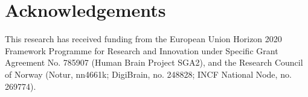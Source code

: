\documentclass[preprint,11pt,authoryear]{elsarticle}
\begin{document}




\section*{Acknowledgements}
\label{sec:acknowledgements}
This research has received funding from the European Union Horizon 2020 Framework Programme for Research
and Innovation under Specific Grant Agreement No. 785907 (Human Brain Project SGA2), and the Research Council of Norway (Notur, nn4661k; DigiBrain, no. 248828; INCF National Node, no. 269774).




\label{sec:bibliography}


\end{document}
